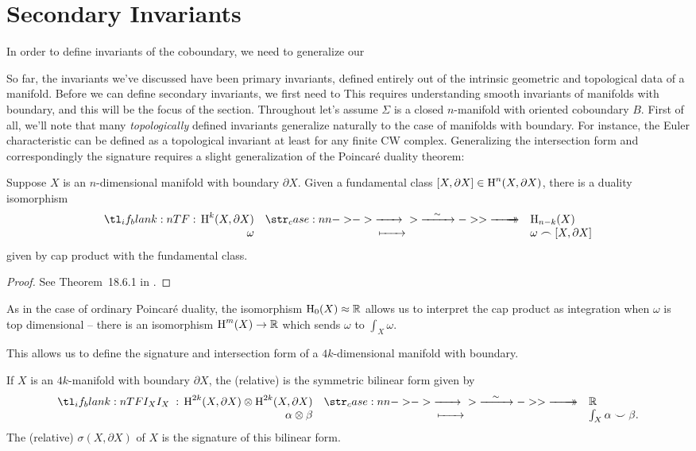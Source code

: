 \section{Secondary Invariants}

In order to define invariants of the coboundary, we need to generalize our

So far, the invariants we've discussed have been primary invariants, defined entirely out of the intrinsic geometric and topological data of a manifold. Before we can define secondary invariants, we first need to
This requires understanding smooth invariants of manifolds with boundary, and this will be the focus of the section.
Throughout let's assume $\Sigma$ is a closed $n$-manifold with oriented coboundary $B$.
First of all, we'll note that many \emph{topologically} defined invariants generalize naturally to the case of manifolds with boundary. For instance, the Euler characteristic can be defined as a topological invariant at least for any finite CW complex.
Generalizing the intersection form and correspondingly the signature requires a slight generalization of the Poincar\'e duality theorem:

\begin{theorem}
	Suppose $X$ is an $n$-dimensional manifold with boundary $\partial X$. Given a fundamental class $[X, \partial X]\in \operatorname{H}^{n}(X, \partial X)$, there is a duality isomorphism
	\[
		\lkxfunc{}{\H^k(X, \partial X)}{\H_{n-k}(X)}{\omega}{\omega\frown [X,\partial X]}
	\]
	given by cap product with the fundamental class.
\end{theorem}
\begin{proof}
	See Theorem~18.6.1 in \cite{dieck2008algebraic}.
\end{proof}
As in the case of ordinary Poincar\'e duality, the isomorphism $\operatorname{H}_0(X)\approx \mathbb{R}$ allows us to interpret the cap product as integration when $\omega$ is top dimensional -- there is an isomorphism $\operatorname{H}^m(X)\to \mathbb{R}$ which sends $\omega$ to $\int_X \omega$.

This allows us to define the signature and intersection form of a $4k$-dimensional manifold with boundary.

\begin{definition}
	If $X$ is an $4k$-manifold with boundary $\partial X$, the (relative)  is the symmetric bilinear form given by
	\[
		\lkxfunc{I_{X}}{\H^{2k}(X, \partial X)\otimes \H^{2k}(X, \partial X)}
		{\R}{\alpha\otimes \beta}{\int_X \alpha\smile \beta.}
	\]
	The (relative)  $\sigma(X, \partial X)$ of $X$ is the signature of this bilinear form.
\end{definition}


